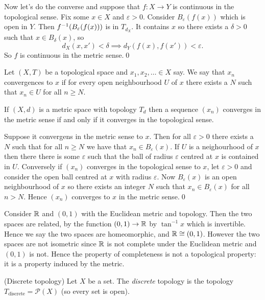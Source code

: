 \documentclass{article}
\begin{document}
Now let's do the converse and suppose that $ f:X\to Y $ is continuous in the topological sense. Fix some $ x\in X $ and $ \varepsilon>0 $. Consider $ B_\varepsilon(f(x)) $ which is open in $ Y $. Then $ {f}^{-1}(B_\varepsilon(f(x))) $ is in $ T_{d_X} $. It contains $ x $ so there exists a $ \delta>0 $ such that $ x\in B_\delta(x) $, so
\[
  d_X(x,x')<\delta \implies d_Y(f(x),f(x'))<\varepsilon.
\]
So $ f $ is continuous in the metric sense.\qed
\begin{definition}
  Let $ (X,T) $ be a topological space and $ x_1,x_2,\dots \in X $ say. We say that $ x_n $ convergences to $ x $ if for every open neighbourhood $ U $ of $ x $ there exists a $ N $ such that $ x_n\in U $ for all $ n\ge N $.
\end{definition}
\begin{proposition}
  If $ (X,d) $ is a metric space with topology $ T_d $ then a sequence $ (x_n) $ converges in the metric sense if and only if it converges in the topological sense.
\end{proposition}
\pf Suppose it convergens in the metric sense to $ x $. Then for all $ \varepsilon>0 $ there exists a $ N $ such that for all $ n\ge N $ we have that $ x_n\in B_\varepsilon(x) $. If $ U $ is a neighourhood of $ x $ then there there is some $ \varepsilon $ such that the ball of radius $ \varepsilon $ centred at $ x $ is contained in $ U $. Conversely if $ (x_n) $ converges in the topological sense to $ x $, let $ \varepsilon>0 $ and consider the open ball centred at $ x $ with radius $ \varepsilon $. Now $ B_\varepsilon(x) $ is an open neighbourhood of $ x $ so there exists an integer $ N $ such that $ x_n\in B_\varepsilon(x) $ for all $ n> N $. Hence $ (x_n) $ converges to $ x $ in the metric sense.\qed
\par
Consider $ \mathbb{R} $ and $ (0,1) $ with the Euclidean metric and topology. Then the two spaces are related, by the function $ (0,1)\to \mathbb{R} $ by $ \tan^{-1}x $ which is invertible. Hence we say the two spaces are homeomorphic, and $ \mathbb{R}\cong (0,1) $. However the two spaces are not isometric since $ \mathbb{R} $ is not complete under the Euclidean metric and $ (0,1) $ is not. Hence the property of completeness is not a topological property: it is a property induced by the metric.
\par
\begin{definition}
	(Discrete topology) Let $ X $ be a set. The \textit{discrete} topology is the topology $ T_{\text{discrete}} = \mathcal P(X) $ (so every set is open).
\end{definition}
\end{document}
